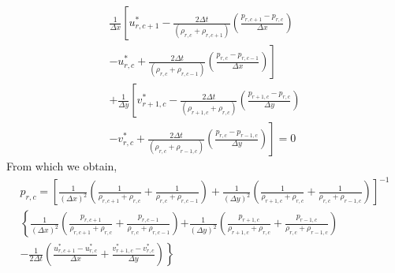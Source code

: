 \begin{eqnarray*}
 \frac{1}{\Delta x}\left[u_{r,c+1}^*-\frac{2\Delta t }{(\rho_{r,c}+\rho_{r,c+1})}\left(\frac{p_{r,c+1}-p_{r,c}}{\Delta x}\right) \right.	\\
- \left. u_{r,c}^*+\frac{2\Delta t }{(\rho_{r,c}+\rho_{r,c-1})}\left(\frac{p_{r,c}-p_{r,c-1}}{\Delta x}\right)\right]	\\
+\frac{1}{\Delta y}\left[v_{r+1,c}^*-\frac{2\Delta t }{(\rho_{r+1,c}+\rho_{r,c})}\left(\frac{p_{r+1,c}-p_{r,c}}{\Delta y}\right) \right.	\\
-\left. v_{r,c}^*+\frac{2\Delta t }{(\rho_{r,c}+\rho_{r-1,c})}\left(\frac{p_{r,c}-p_{r-1,c}}{\Delta y}\right)\right]	=0
\end{eqnarray*}
From which we obtain,
 \begin{eqnarray*}
p_{r,c} = \left[\frac{1}{(\Delta x)^2}\left(\frac{1}{\rho_{r,c+1}+\rho_{r,c}}+\frac{1}{\rho_{r,c}+\rho_{r,c-1}}\right)
+\frac{1}{(\Delta y)^2}\left(\frac{1}{\rho_{r+1,c}+\rho_{r,c}}+\frac{1}{\rho_{r,c}+\rho_{r-1,c}}\right)\right]^{-1} \\
\left\{\frac{1}{(\Delta x)^2}\left(\frac{p_{r,c+1}}{\rho_{r,c+1}+\rho_{r,c}}+\frac{p_{r,c-1}}{\rho_{r,c}+\rho_{r,c-1}}\right)\right.
\left.+\frac{1}{(\Delta y)^2}\left(\frac{p_{r+1,c}}{\rho_{r+1,c}+\rho_{r,c}}+\frac{p_{r-1,c}}{\rho_{r,c}+\rho_{r-1,c}}\right)\right. \\
-\frac{1}{2\Delta t}\left. \left(\frac{u_{r,c+1}^*-u_{r,c}^*}{\Delta x} +\frac{v_{r+1,c}^*-v_{r,c}^*}{\Delta y}\right)\right\}
 \end{eqnarray*}


